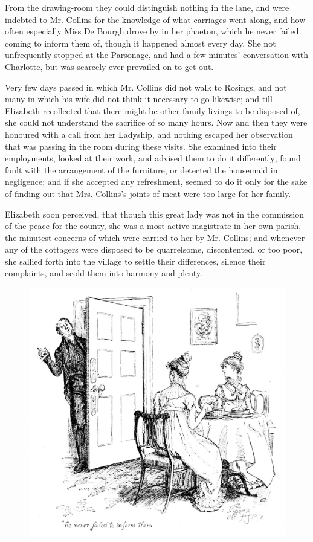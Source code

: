 \documentclass[10pt]{book}
\begin{document}
   From the drawing-room they could distinguish nothing in the lane, and
were indebted to Mr. Collins for the knowledge of what carriages went
along, and how often especially Miss De Bourgh drove by in her phaeton,
which he never failed coming to inform them of, though it happened
almost every day. She not unfrequently stopped at the Parsonage, and had
a few minutes’ conversation with Charlotte, but was scarcely ever
prevailed on to get out.
  

   Very few days passed in which Mr. Collins did not walk to Rosings, and
not many in which his wife did not think it necessary to go likewise;
and till Elizabeth recollected that there might be other family livings
to be disposed of, she could not understand the sacrifice of so many
hours. Now and then they were honoured with a call from her Ladyship,
and nothing escaped her observation that was passing in the room during
these visits. She examined into their employments, looked at their work,
and advised them to do it differently; found fault with the arrangement
of the furniture, or detected the housemaid in negligence; and if she
accepted any refreshment, seemed to do it only for the sake of finding
out that Mrs. Collins’s joints of meat were too large for her family.
  

   Elizabeth soon perceived, that though this great lady was not in the
commission of the peace for the county, she was a most active magistrate
in her own parish, the minutest concerns of which were carried to her by
Mr. Collins; and whenever any of the cottagers were disposed to be
quarrelsome, discontented, or too poor, she sallied forth into the
village to settle their differences, silence their complaints, and scold
them into harmony and plenty.
  

\begin{figure}[h]
\centering
\includegraphics[width=\linewidth]{images/i_240.jpg}
\end{figure}
\end{document}
